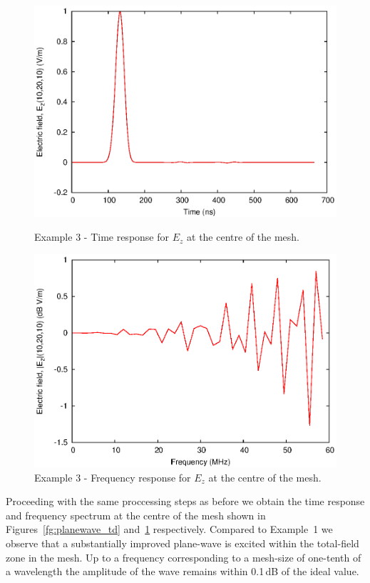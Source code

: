 \documentclass[onecolumn,a4paper]{article}
\numberwithin{equation}{section}
\begin{document}
\begin{figure}[ht!]
 \centerline{\includegraphics[width=12cm]{figures/planewave_td}}
 \caption{\label{fg:planewave_td} Example 3 - Time response for $E_z$ at the centre of the mesh.}
 \centerline{\includegraphics[width=12cm]{figures/planewave_fd}}
 \caption{\label{fg:planewave_fd} Example 3 - Frequency response for $E_z$ at the centre of the mesh.}
\end{figure}

Proceeding with the same proccessing steps as before we obtain the time response and frequency spectrum at the
centre of the mesh shown in Figures~\ref{fg:planewave_td} and~\ref{fg:planewave_fd} respectively. Compared to Example~1 we
observe that a substantially improved plane-wave is excited within the total-field zone in the mesh. Up to a 
frequency corresponding to a mesh-size of one-tenth of a wavelength the amplitude of the wave remains within
0.1\,dB of the ideal value.
\end{document}
